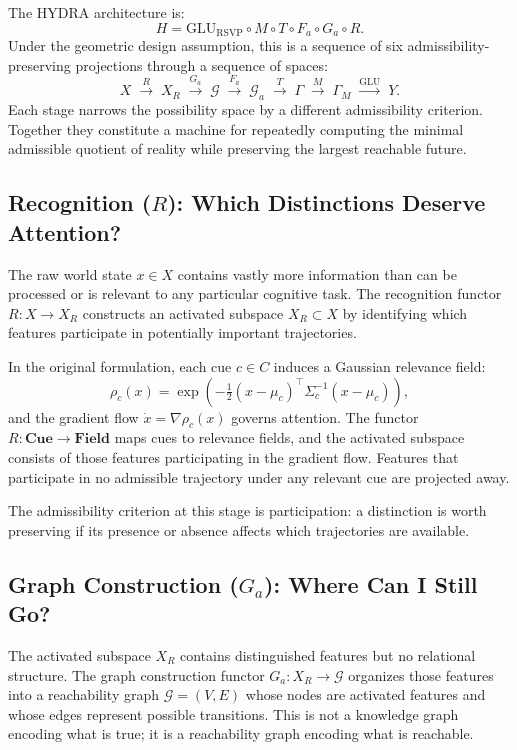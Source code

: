 \documentclass[12pt, oneside]{book}
\theoremstyle{flyxion}
\theoremstyle{definition}
\begin{document}
The HYDRA architecture is:
\[
H = \mathrm{GLU}_\mathrm{RSVP} \circ M \circ T \circ F_a \circ G_a
    \circ R.
\]
Under the geometric design assumption, this is a sequence of six
admissibility-preserving projections through a sequence of spaces:
\[
X \;\xrightarrow{R}\; X_R \;\xrightarrow{G_a}\; \mathcal{G}
  \;\xrightarrow{F_a}\; \mathcal{G}_a \;\xrightarrow{T}\; \Gamma
  \;\xrightarrow{M}\; \Gamma_M \;\xrightarrow{\mathrm{GLU}}\; Y.
\]
Each stage narrows the possibility space by a different admissibility
criterion. Together they constitute a machine for repeatedly computing
the minimal admissible quotient of reality while preserving the largest
reachable future.

\subsection{Recognition ($R$): Which Distinctions Deserve Attention?}

The raw world state $x \in X$ contains vastly more information than
can be processed or is relevant to any particular cognitive task. The
recognition functor $R : X \to X_R$ constructs an activated subspace
$X_R \subset X$ by identifying which features participate in
potentially important trajectories.

In the original formulation, each cue $c \in C$ induces a Gaussian
relevance field:
\[
\rho_c(x) = \exp\!\left(-\tfrac{1}{2}(x - \mu_c)^\top \Sigma_c^{-1}
            (x - \mu_c)\right),
\]
and the gradient flow $\dot{x} = \nabla\rho_c(x)$ governs attention.
The functor $R : \mathbf{Cue} \to \mathbf{Field}$ maps cues to
relevance fields, and the activated subspace consists of those features
participating in the gradient flow. Features that participate in no
admissible trajectory under any relevant cue are projected away.

The admissibility criterion at this stage is participation: a
distinction is worth preserving if its presence or absence affects
which trajectories are available.

\subsection{Graph Construction ($G_a$): Where Can I Still Go?}

The activated subspace $X_R$ contains distinguished features but no
relational structure. The graph construction functor
$G_a : X_R \to \mathcal{G}$ organizes those features into a
reachability graph $\mathcal{G} = (V, E)$ whose nodes are activated
features and whose edges represent possible transitions. This is not a
knowledge graph encoding what is true; it is a reachability graph
encoding what is reachable.
\end{document}
